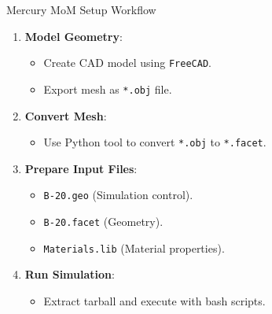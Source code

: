 \begin{frame}{Mercury MoM Setup Workflow}
    \begin{enumerate}
        \item \textbf{Model Geometry}:
            \begin{itemize}
                \item Create CAD model using \texttt{FreeCAD}.
                \item Export mesh as \texttt{*.obj} file.
            \end{itemize}
        \item \textbf{Convert Mesh}:
            \begin{itemize}
                \item Use Python tool to convert \texttt{*.obj} to \texttt{*.facet}.
            \end{itemize}
        \item \textbf{Prepare Input Files}:
            \begin{itemize}
                \item \texttt{B-20.geo} (Simulation control).
                \item \texttt{B-20.facet} (Geometry).
                \item \texttt{Materials.lib} (Material properties).
            \end{itemize}
        \item \textbf{Run Simulation}:
            \begin{itemize}
                \item Extract tarball and execute with bash scripts.
            \end{itemize}
    \end{enumerate}
\end{frame}


